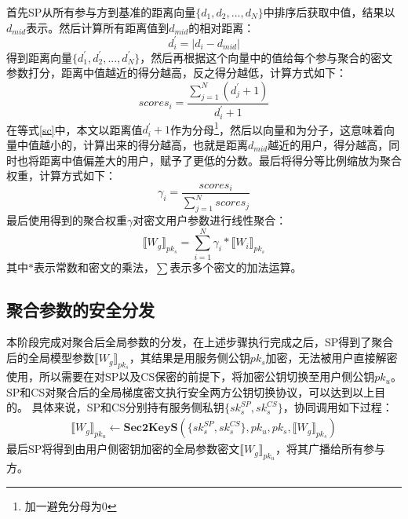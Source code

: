 首先SP从所有参与方到基准的距离向量$\{d_1, d_2,...,d_N\}$中排序后获取中值，结果以$d_{mid}$表示。然后计算所有距离值到$ d_{mid} $的相对距离：
\begin{equation}\label{dToMid}
	d^{\prime}_{i}=\left|d_i-d_{mid}\right|
\end{equation}
得到距离向量$\{d^{\prime}_1, d^{\prime}_2,...,d^{\prime}_N\}$，然后再根据这个向量中的值给每个参与聚合的密文参数打分，距离中值越近的得分越高，反之得分越低，计算方式如下：
\begin{equation}\label{sc}
	scores_i=\frac{\sum_{j=1}^{N} (d^{\prime}_{j} + 1)}{d^{\prime}_i + 1}
\end{equation}
在等式\ref{sc}中，本文以距离值$d^{\prime}_i + 1$作为分母\footnote{加一避免分母为0}，然后以向量和为分子，这意味着向量中值越小的，计算出来的得分越高，也就是距离$d_{mid}$越近的用户，得分越高，同时也将距离中值偏差大的用户，赋予了更低的分数。最后将得分等比例缩放为聚合权重，计算方式如下：
\begin{equation}
	\gamma_i=\dfrac{scores_i}{\sum_{j=1}^{N} scores_j}
\end{equation}
最后使用得到的聚合权重$\gamma$对密文用户参数进行线性聚合：
\begin{equation}\label{e3}
	\llbracket W_g\rrbracket_{pk_s}=\sum_{i=1}^{N}\gamma_i*\llbracket W_i\rrbracket_{pk_s}
\end{equation}
其中$*$表示常数和密文的乘法，$\sum$表示多个密文的加法运算。

\subsection{聚合参数的安全分发}
本阶段完成对聚合后全局参数的分发，在上述步骤执行完成之后，SP得到了聚合后的全局模型参数$ \llbracket W_g\rrbracket_{pk_s} $，其结果是用服务侧公钥$pk_s$加密，无法被用户直接解密使用，所以需要在对SP以及CS保密的前提下，将加密公钥切换至用户侧公钥$pk_u$。
SP和CS对聚合后的全局梯度密文执行安全两方公钥切换协议，可以达到以上目的。
具体来说，SP和CS分别持有服务侧私钥$\{sk_s^{SP}, sk_s^{CS}\}$，协同调用如下过程：
	\begin{equation}\label{e4}
		\begin{aligned}
			\llbracket W_g\rrbracket_{pk_u} \leftarrow \textbf{Sec2KeyS}(\{sk_s^{SP}, sk_s^{CS}\}, pk_u, pk_s, \llbracket W_g\rrbracket_{pk_s})
		\end{aligned}
	\end{equation}
最后SP将得到由用户侧密钥加密的全局参数密文$\llbracket W_g\rrbracket_{pk_u}$，将其广播给所有参与方。

